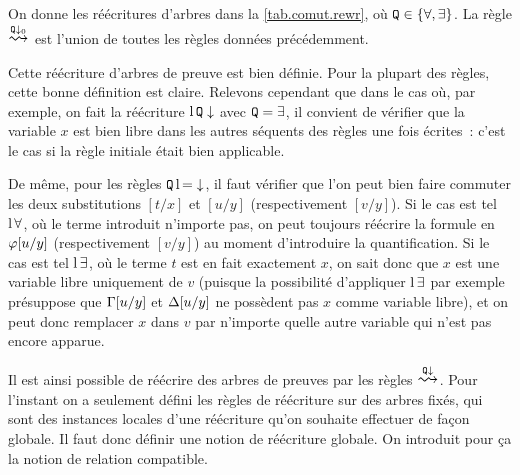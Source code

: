 \begin{definition}
  On donne les réécritures d'arbres dans la \cref{tab.comut.rewr}, où
  ${\normalfont\texttt{Q}}\in\{\forall,\exists\}$. La règle $\reecr{\quantif\downarrow_0}$
  est l'union de toutes les règles données précédemment.
\end{definition}

\begin{remark}
  Cette réécriture d'arbres de preuve est bien définie. Pour la plupart des
  règles, cette bonne définition est claire. Relevons cependant que dans le
  cas où, par exemple, on fait la réécriture $\operatorname{l}{\mathord{{\normalfont\texttt{Q}}}}\downarrow$ avec
  ${\normalfont\texttt{Q}} = \exists$, il convient de vérifier que la variable $x$ est
  bien libre dans les autres séquents des règles une fois écrites~: c'est le
  cas si la règle initiale était bien applicable.

  De même, pour les règles ${\normalfont\texttt{Q}}\operatorname{l}{\mathord{=}}\downarrow$, il faut vérifier que
  l'on peut bien faire commuter les deux substitutions $[t/x]$ et $[u/y]$
  (respectivement $[v/y]$). Si le cas est tel $\operatorname{l}\mathord{\forall}$, où le terme introduit
  n'importe pas, on peut toujours réécrire la formule en $\varphi[u/y]$
  (respectivement $[v/y]$) au moment d'introduire la quantification. Si le cas
  est tel $\operatorname{l}\mathord{\exists}$, où le terme $t$ est en fait exactement $x$, on sait donc
  que $x$ est une variable libre uniquement de $v$ (puisque la possibilité
  d'appliquer $\operatorname{l}\mathord{\exists}$ par exemple présuppose que $\Gamma[u/y]$ et
  $\Delta[u/y]$ ne possèdent pas $x$ comme variable libre), et on peut donc
  remplacer $x$ dans $v$ par n'importe quelle autre variable qui n'est pas
  encore apparue.
\end{remark}

Il est ainsi possible de réécrire des arbres de preuves par les règles
$\reecr{\quantif\downarrow}$. Pour l'instant on a seulement
défini les règles de réécriture sur des arbres fixés, qui sont des instances
locales d'une réécriture qu'on souhaite effectuer de façon globale. Il faut
donc définir une notion de réécriture globale. On introduit pour ça la notion
de relation compatible.

